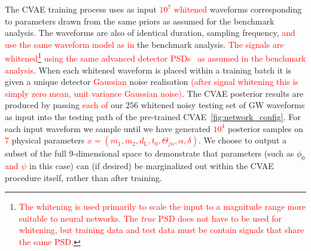 \documentclass[%
showpacs,
 amsmath,amssymb,
 aps,
 twocolumn,
 prl,
 reprint,
floatfix,
]{revtex4-1}
\newcommand{\new}[1]{\textcolor{red}{#1}}
\begin{document}
%
%
The \ac{CVAE} training process uses as input \new{$10^{7}$} \new{whitened}
waveforms corresponding to parameters drawn from the same priors as assumed for
the benchmark analysis. The waveforms are also of identical duration, sampling
frequency, \new{and use the same waveform model as in} the benchmark analysis.
\new{The signals are whitened}\footnote{\new{The whitening is used primarily to
scale the input to a magnitude range more suitable to neural networks. The
\emph{true} \ac{PSD} does not have to be used for whitening, but training data
and test data must be contain signals that share the same \ac{PSD}.}}
\new{using the same advanced detector \acp{PSD}~\cite{aligo_noisecurves} as
assumed in the benchmark analysis}. When each whitened waveform is placed
within a training batch it is given a unique detector \new{Gaussian} noise
realisation \new{(after signal whitening this is simply zero mean, unit
variance Gaussian noise)}. The \ac{CVAE} posterior results are produced by
passing \new{each of} our $256$ whitened noisy testing set of \ac{GW} waveforms
as input into the testing path of the pre-trained
\ac{CVAE}~\ref{fig:network_config}. For each input waveform we sample until we
have generated \new{$10^4$} posterior samples on \new{7} physical parameters
\new{$x=(m_1,m_2,d_{\text{L}},t_{0},\Theta_{jn},\alpha,\delta)$}. We choose to
output a subset of the full 9-dimensional space to demonstrate that parameters
(such as $\phi_0$ \new{and $\psi$} in this case) can (if desired) be
marginalized out within the \ac{CVAE} procedure itself, rather than after
training. 
\end{document}
